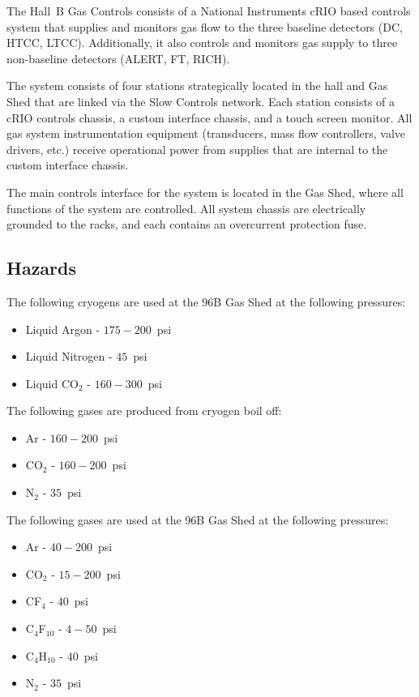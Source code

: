 The Hall~B Gas Controls consists of a National Instruments cRIO based controls system 
that supplies and monitors gas flow to the three baseline detectors (DC, HTCC, 
LTCC). Additionally, it also controls and monitors gas supply to three non-baseline 
detectors (ALERT, FT, RICH). 

The system consists of four stations strategically located in the hall and Gas Shed that 
are linked via the Slow Controls network. Each station consists of a cRIO controls chassis, 
a custom interface chassis, and a touch screen monitor. All gas system instrumentation 
equipment (transducers, mass flow controllers, valve drivers, etc.) receive operational 
power from supplies that are internal to the custom interface chassis. 

The main controls interface for the system is located in the Gas Shed, where all functions 
of the system are controlled. All system chassis are electrically grounded to the racks, 
and each contains an overcurrent protection fuse. 

\subsection{Hazards} 

The following cryogens are used at the 96B Gas Shed at the following pressures:
\begin{itemize}
\item Liquid Argon - $175 - 200$~psi
\item Liquid Nitrogen - $45$~psi
\item Liquid CO$_2$ - $160 - 300$~psi
\end{itemize}

The following gases are produced from cryogen boil off:

\begin{itemize}
\item Ar - $160 - 200$~psi
\item CO$_2$ - $160 - 200$~psi
\item N$_2$ - $35$~psi
\end{itemize}

The following gases are used at the 96B Gas Shed at the following pressures:

\begin{itemize}
\item Ar - $40 - 200$~psi
\item CO$_2$ - $15-200$~psi
\item CF$_4$ - $40$~psi
\item C$_4$F$_{10}$ - $4 - 50$~psi
\item C$_4$H$_{10}$ - $40$~psi
\item N$_2$ - $35$~psi
\end{itemize}

